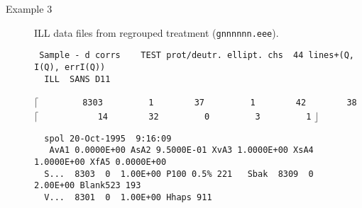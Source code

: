 \begin{description}
\item[Example 3] ILL data files from regrouped treatment ({\tt gnnnnnn.eee}).\\
{\tiny
\begin{verbatim}
 Sample - d corrs    TEST prot/deutr. ellipt. chs  44 lines+(Q, I(Q), errI(Q))
  ILL  SANS D11
\end{verbatim}
\textcolor[rgb]{0.98,0.00,0.00}{$\mathbf{\lceil}$}
\verb"        8303         1        37         1        42        38"\\
\textcolor[rgb]{1.0,1.00,1.00}{$\mathbf{\lceil}$}
\verb"           14        32         0         3         1"
\textcolor[rgb]{0.98,0.00,0.00}{$\mathbf{\rfloor}$}
\begin{verbatim}
  spol 20-Oct-1995  9:16:09
   AvA1 0.0000E+00 AsA2 9.5000E-01 XvA3 1.0000E+00 XsA4 1.0000E+00 XfA5 0.0000E+00
  S...  8303  0  1.00E+00 P100 0.5% 221   Sbak  8309  0  2.00E+00 Blank523 193
  V...  8301  0  1.00E+00 Hhaps 911


\end{verbatim}}
\end{description}
